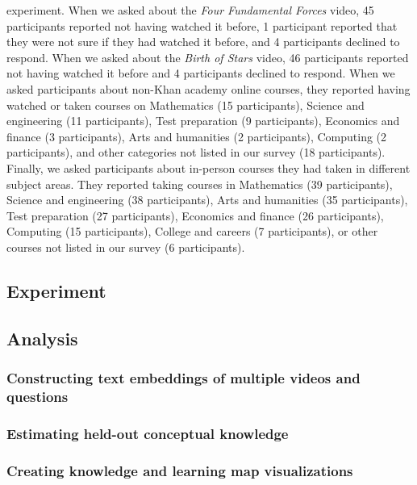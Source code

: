 \documentclass[10pt]{article}
\begin{document}
experiment.  When we asked about the \textit{Four Fundamental Forces}
video, 45 participants reported not having watched it before, 1
participant reported that they were not sure if they had watched it
before, and 4 participants declined to respond.  When we asked about
the \textit{Birth of Stars} video, 46 participants reported not having
watched it before and 4 participants declined to respond.  When we
asked participants about non-Khan academy online courses, they
reported having watched or taken courses on Mathematics (15
participants), Science and engineering (11 participants), Test
preparation (9 participants), Economics and finance (3 participants),
Arts and humanities (2 participants), Computing (2 participants), and
other categories not listed in our survey (18 participants).  Finally,
we asked participants about in-person courses they had taken in
different subject areas.  They reported taking courses in Mathematics
(39 participants), Science and engineering (38 participants), Arts and
humanities (35 participants), Test preparation (27 participants),
Economics and finance (26 participants), Computing (15 participants),
College and careers (7 participants), or other courses not listed in
our survey (6 participants).




\subsection*{Experiment}

\subsection*{Analysis}

\subsubsection*{Constructing text embeddings of multiple videos and questions}

\subsubsection*{Estimating held-out conceptual knowledge}

\subsubsection*{Creating knowledge and learning map visualizations}





\end{document}
